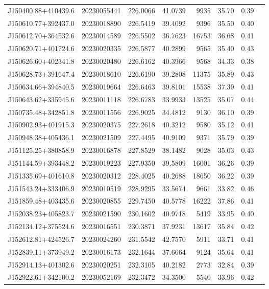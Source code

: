 \documentclass{article}
\begin{document}
\begin {longtable}{|l|l|r|r|r|r|r|l|}
 J150400.88+410439.6&  20230055441&  226.0066&   41.0739&  9935& 35.70& 0.39&\\
 J150610.77+392437.0&  20230018890&  226.5419&   39.4092&  9396& 35.50& 0.40&\\
 J150612.70+364532.6&  20230014589&  226.5502&   36.7623& 16753& 36.68& 0.41&\\
 J150620.71+401724.6&  20230020335&  226.5877&   40.2899&  9565& 35.40& 0.43&\\
 J150626.60+402341.8&  20230020480&  226.6162&   40.3966&  9568& 34.33& 0.38&\\
 J150628.73+391647.4&  20230018610&  226.6190&   39.2808& 11375& 35.89& 0.43&\\
 J150634.66+394840.5&  20230019664&  226.6463&   39.8101& 15538& 37.39& 0.41&\\
 J150643.62+335945.6&  20230011118&  226.6783&   33.9933& 13525& 35.07& 0.44&\\
 J150735.48+342851.8&  20230011556&  226.9025&   34.4812&  9130& 36.10& 0.39&\\
 J150902.93+401915.3&  20230020375&  227.2618&   40.3212&  9580& 35.12& 0.41&\\
 J150948.38+405436.1&  20230021509&  227.4495&   40.9109&  9371& 35.79& 0.39&\\
 J151125.25+380858.9&  20230016878&  227.8529&   38.1482&  9028& 35.03& 0.43&\\
 J151144.59+393448.2&  20230019223&  227.9350&   39.5809& 16001& 36.26& 0.39&\\
 J151335.69+401610.8&  20230020312&  228.4025&   40.2688& 18650& 36.22& 0.39&\\
 J151543.24+333406.9&  20230010519&  228.9295&   33.5674&  9661& 33.82& 0.46&\\
 J151859.48+403435.6&  20230020855&  229.7450&   40.5778& 16222& 37.86& 0.41&\\
 J152038.23+405823.7&  20230021590&  230.1602&   40.9718&  5419& 33.95& 0.40&\\
 J152134.12+375524.6&  20230016551&  230.3871&   37.9231& 13617& 35.84& 0.42&\\
 J152612.81+424526.7&  20230024260&  231.5542&   42.7570&  5911& 33.71& 0.41&\\
 J152839.11+373949.2&  20230016173&  232.1644&   37.6664&  9124& 35.64& 0.41&\\
 J152914.13+401302.6&  20230020251&  232.3105&   40.2182&  2773& 32.84& 0.39&\\
 J152922.61+342100.2&  20230052169&  232.3472&   34.3500&  5540& 33.96& 0.42&\\

\end{longtable}
\end{document}
